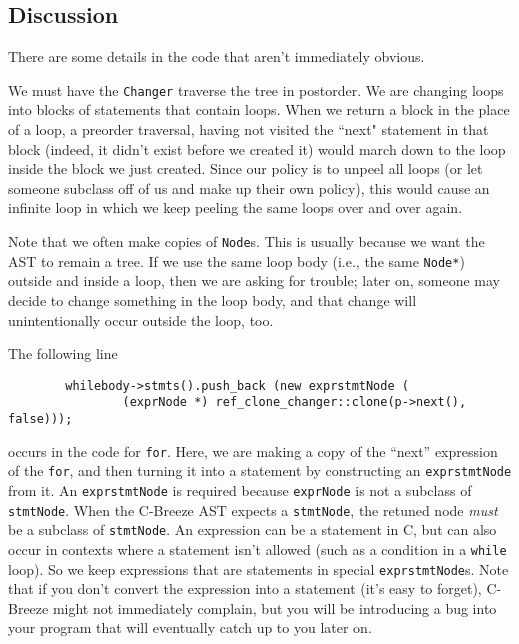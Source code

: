 \documentclass[10pt]{article}
\begin{document}
\subsection{Discussion}

There are some details in the code that aren't immediately obvious.

We must have the {\tt Changer} traverse the tree in postorder.  We are
changing loops into blocks of statements that contain loops.  When we return
a block in the place of a loop, a preorder traversal, having not visited the
``next" statement in that block (indeed, it didn't exist before we created
it) would march down to the loop inside the block we just created.  Since our
policy is to unpeel all loops (or let someone subclass off of us and make up
their own policy), this would cause an infinite loop in which we keep peeling
the same loops over and over again.

Note that we often make copies of {\tt Node}s.  This is usually because we
want the AST to remain a tree.  If we use the same loop body (i.e., the same
{\tt Node*}) outside and inside a loop, then we are asking for trouble; later
on, someone may decide to change something in the loop body, and that change
will unintentionally occur outside the loop, too.

The following line

\begin{small}
\begin{verbatim}
        whilebody->stmts().push_back (new exprstmtNode (
                (exprNode *) ref_clone_changer::clone(p->next(), false)));
\end{verbatim}
\end{small}

\noindent
occurs in the code for {\tt for}.  Here, we are making a copy of the ``next''
expression of the {\tt for}, and then turning it into a statement by
constructing an {\tt exprstmtNode} from it.  An {\tt exprstmtNode} is
required because {\tt exprNode} is not a subclass of {\tt stmtNode}.  When
the C-Breeze AST expects a {\tt stmtNode}, the retuned node {\em must} be a
subclass of {\tt stmtNode}.  An expression can be a statement in C, but can
also occur in contexts where a statement isn't allowed (such as a condition
in a {\tt while} loop).  So we keep expressions that are statements in
special {\tt exprstmtNode}s.  Note that if you don't convert the expression
into a statement (it's easy to forget), C-Breeze might not immediately
complain, but you will be introducing a bug into your program that will
eventually catch up to you later on.
\end{document}
